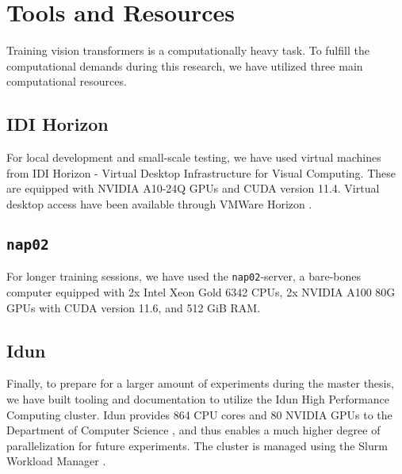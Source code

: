 \section{Tools and Resources}

Training vision transformers is a computationally heavy task.
To fulfill the computational demands during this research,
we have utilized three main computational resources.


\subsection{IDI Horizon}

For local development and small-scale testing,
we have used virtual machines from
IDI Horizon - Virtual Desktop Infrastructure for Visual Computing.
These are equipped with NVIDIA A10-24Q GPUs and CUDA version 11.4.
Virtual desktop access have been available through VMWare Horizon \cite{software:vmware:horizon}.


\subsection{\texttt{nap02}}

For longer training sessions,
we have used the \texttt{nap02}-server,
a bare-bones computer equipped with
2x Intel Xeon Gold 6342 CPUs,
2x NVIDIA A100 80G GPUs with CUDA version 11.6,
and 512 GiB RAM.


\subsection{Idun}

Finally,
to prepare for a larger amount of experiments during the master thesis,
we have built tooling and documentation to utilize the Idun High Performance Computing cluster.
Idun provides 864 CPU cores and 80 NVIDIA GPUs to the Department of Computer Science \cite{idun:overview},
and thus enables a much higher degree of parallelization for future experiments.
The cluster is managed using the Slurm Workload Manager .

